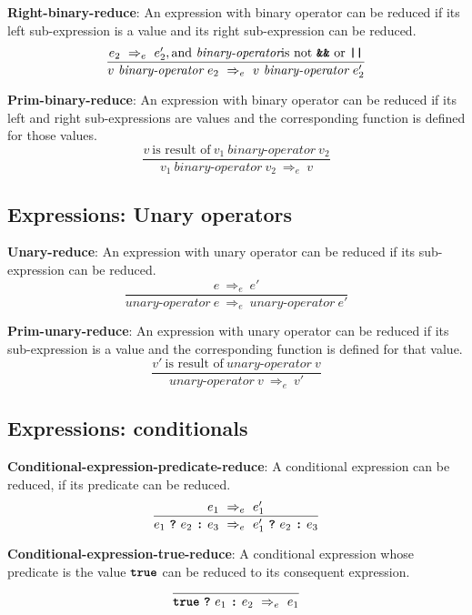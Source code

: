\vspace{10mm}
\textbf{Right-binary-reduce}: An expression with binary operator
can be reduced if its left sub-expression is a value and its right
sub-expression can be reduced.
\[
\frac{
  e_2\ \Rightarrow_e\ e_2', \textrm{and}\ \textit{binary-operator}
  \mbox{is not}\ \textbf{\texttt{\&\&}}\ \textrm{or}\ \texttt{\textbf{||}}
}{
  v\  \textit{binary-operator} \ e_2
  \ \Rightarrow_e \ 
  v\  \textit{binary-operator} \ e_2'
}
\]

\vspace{10mm}
\textbf{Prim-binary-reduce}: An expression with binary operator
can be reduced if its left and right sub-expressions are values and
the corresponding function is defined for those values.
\[
\frac{
  v\ \mbox{is result of}\ v_1\  \textit{binary-operator} \ v_2
}{
  v_1\  \textit{binary-operator} \ v_2
  \ \Rightarrow_e \ 
  v
}
\]

\subsection*{Expressions: Unary operators}

\textbf{Unary-reduce}: An expression with unary operator
can be reduced if its sub-expression can be reduced.
\[
\frac{
  e \ \Rightarrow_e \ e'
}{
  \textit{unary-operator} \ e
  \ \Rightarrow_e \ 
  \textit{unary-operator} \ e'
}
\]

\vspace{10mm}
\textbf{Prim-unary-reduce}: An expression with unary operator
can be reduced if its sub-expression is a value and
the corresponding function is defined for that value.
\[
\frac{
  v'\ \mbox{is result of}\ \textit{unary-operator} \ v
}{
  \textit{unary-operator} \ v
  \ \Rightarrow_e \ 
  v'
}
\]

\subsection*{Expressions: conditionals}

\textbf{Conditional-expression-predicate-reduce}: A conditional
expression can be reduced, if its predicate can be reduced.
\[
\frac{
  e_1 \ \Rightarrow_e \ e_1'
}{
  e_1\  \textbf{\texttt{?}}\ e_2\ \textbf{\texttt{:}}\ e_3
  \ \Rightarrow_e \ 
  e_1'\ \textbf{\texttt{?}}\ e_2\ \textbf{\texttt{:}}\ e_3
}
\]

\vspace{10mm}
\textbf{Conditional-expression-true-reduce}: A conditional
expression whose predicate is the value
$\textbf{\texttt{true}}$
can be reduced to its consequent expression.
\[
\frac{
}{
  \textbf{\texttt{true}}\  \textbf{\texttt{?}}\ e_1\ \textbf{\texttt{:}}\ e_2
  \ \Rightarrow_e \ 
  e_1
}
\]


